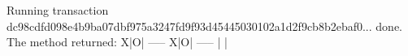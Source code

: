\begin{shellbox}\begin{ttlst}
Running transaction dc98cdfd098e4b9ba07dbf975a3247fd9f93d45445030102a1d2f9cb8b2ebaf0... done.
The method returned:
X|O| 
-----
X|O| 
-----
 | | 
\end{ttlst}\end{shellbox}
